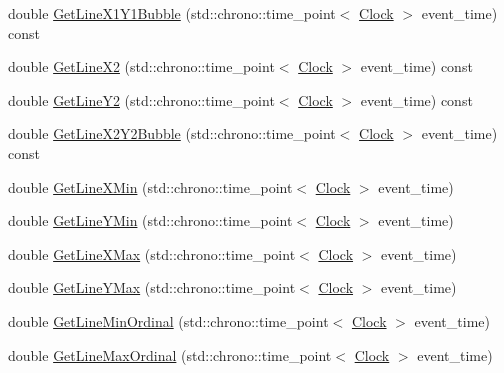 \begin{DoxyCompactItemize}
\item 
double \mbox{\hyperlink{classLine_adc3c6c42d1b3d172e32fad59db2e3eaa}{Get\+Line\+X1\+Y1\+Bubble}} (std\+::chrono\+::time\+\_\+point$<$ \mbox{\hyperlink{universe_8h_a0ef8d951d1ca5ab3cfaf7ab4c7a6fd80}{Clock}} $>$ event\+\_\+time) const
\item 
double \mbox{\hyperlink{classLine_a9cdf38d7aaeadfa35136dd417865c189}{Get\+Line\+X2}} (std\+::chrono\+::time\+\_\+point$<$ \mbox{\hyperlink{universe_8h_a0ef8d951d1ca5ab3cfaf7ab4c7a6fd80}{Clock}} $>$ event\+\_\+time) const
\item 
double \mbox{\hyperlink{classLine_a6222d15f883f3183ec9eed085046916a}{Get\+Line\+Y2}} (std\+::chrono\+::time\+\_\+point$<$ \mbox{\hyperlink{universe_8h_a0ef8d951d1ca5ab3cfaf7ab4c7a6fd80}{Clock}} $>$ event\+\_\+time) const
\item 
double \mbox{\hyperlink{classLine_a2432406f734963e4497541081a843131}{Get\+Line\+X2\+Y2\+Bubble}} (std\+::chrono\+::time\+\_\+point$<$ \mbox{\hyperlink{universe_8h_a0ef8d951d1ca5ab3cfaf7ab4c7a6fd80}{Clock}} $>$ event\+\_\+time) const
\item 
double \mbox{\hyperlink{classLine_ac4a6e8f232b529169d91b9f44496933b}{Get\+Line\+X\+Min}} (std\+::chrono\+::time\+\_\+point$<$ \mbox{\hyperlink{universe_8h_a0ef8d951d1ca5ab3cfaf7ab4c7a6fd80}{Clock}} $>$ event\+\_\+time)
\item 
double \mbox{\hyperlink{classLine_ae8151f5f3b102924b09de686f536e220}{Get\+Line\+Y\+Min}} (std\+::chrono\+::time\+\_\+point$<$ \mbox{\hyperlink{universe_8h_a0ef8d951d1ca5ab3cfaf7ab4c7a6fd80}{Clock}} $>$ event\+\_\+time)
\item 
double \mbox{\hyperlink{classLine_a1393a4dcd9fa9e1ab1653c37d76c8c3a}{Get\+Line\+X\+Max}} (std\+::chrono\+::time\+\_\+point$<$ \mbox{\hyperlink{universe_8h_a0ef8d951d1ca5ab3cfaf7ab4c7a6fd80}{Clock}} $>$ event\+\_\+time)
\item 
double \mbox{\hyperlink{classLine_ab033cff3a24b67be829759d16f13c281}{Get\+Line\+Y\+Max}} (std\+::chrono\+::time\+\_\+point$<$ \mbox{\hyperlink{universe_8h_a0ef8d951d1ca5ab3cfaf7ab4c7a6fd80}{Clock}} $>$ event\+\_\+time)
\item 
double \mbox{\hyperlink{classLine_a7b105f0af704489446cc93302c30813d}{Get\+Line\+Min\+Ordinal}} (std\+::chrono\+::time\+\_\+point$<$ \mbox{\hyperlink{universe_8h_a0ef8d951d1ca5ab3cfaf7ab4c7a6fd80}{Clock}} $>$ event\+\_\+time)
\item 
double \mbox{\hyperlink{classLine_a3fc7779998759b641ec2b7bc8515563a}{Get\+Line\+Max\+Ordinal}} (std\+::chrono\+::time\+\_\+point$<$ \mbox{\hyperlink{universe_8h_a0ef8d951d1ca5ab3cfaf7ab4c7a6fd80}{Clock}} $>$ event\+\_\+time)

\end{DoxyCompactItemize}
